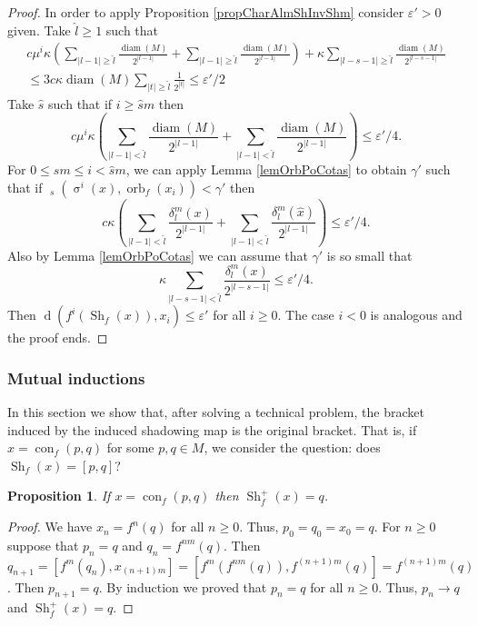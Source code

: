 \documentclass[12pt]{amsart}
\DeclareMathOperator{\shift}{\sigma}
\theoremstyle{plain}
\newtheorem{prop}[thm]{Proposition}
\theoremstyle{definition}
\theoremstyle{remark}
\DeclareMathOperator{\diam}{diam}
\DeclareMathOperator{\dist}{d}
\DeclareMathOperator{\tdist}{\tilde{d}}
\DeclareMathOperator{\orb}{orb}
\DeclareMathOperator{\con}{con}
\DeclareMathOperator{\shm}{Sh}
\renewcommand{\epsilon}{\varepsilon}
\begin{document}
\begin{proof}
	In order to apply Proposition \ref{propCharAlmShInvShm} consider $\epsilon'>0$ given.
	Take $\hat l\geq 1$ such that
	\begin{align*}
	c\mu^i\kappa
	\left(
	\sum_{|l-1|\geq\hat l}\frac{\diam(M)}{2^{|l-1|}}
	+
	\sum_{|l-1|\geq\hat l}\frac{\diam(M)}{2^{|l-1|}}
	\right)
	+
	\kappa \sum_{|l-s-1|\geq\hat l}\frac{\diam(M)}{2^{|l-s-1|}}\\
	\leq 3c\kappa\diam(M)\sum_{|t|\geq\hat l}\frac{1}{2^{|t|}}
	\leq\epsilon'/2
	\end{align*}
	Take $\hat s$ such that if $i\geq \hat sm$ then
	\[
	c\mu^i\kappa
	\left(
	\sum_{|l-1|<\hat l}\frac{\diam(M)}{2^{|l-1|}}
	+
	\sum_{|l-1|<\hat l}\frac{\diam(M)}{2^{|l-1|}}
	\right)
	\leq \epsilon'/4.
	\]
	For $0\leq sm\leq i<\hat s m$, we can apply Lemma \ref{lemOrbPoCotas} to obtain $\gamma'$ such that if
	$\tdist_s(\shift^i(x),\orb_f(x_i))<\gamma'$ then
	\[
	c\kappa
	\left(
	\sum_{|l-1|<\hat l}\frac{\delta_l^m(x)}{2^{|l-1|}}
	+
	\sum_{|l-1|<\hat l}\frac{\delta_l^m(\hat x)}{2^{|l-1|}}
	\right)\leq \epsilon'/4.
	\]
	Also by Lemma \ref{lemOrbPoCotas} we can assume that $\gamma'$ is so small that
	\[
		\kappa \sum_{|l-s-1|<\hat l}\frac{\delta_l^m(x)}{2^{|l-s-1|}}\leq\epsilon'/4.
	\]
	Then $\dist(f^i(\shm_f(x)),x_i)\leq\epsilon'$ for all $i\geq 0$. The case $i<0$ is analogous and the proof ends.
\end{proof}

\subsubsection{Mutual inductions}
In this section we show that, after solving a technical problem, the bracket induced by the induced shadowing map is the original bracket.
That is, if
 $x=\con_f(p,q)$ for some $p,q\in M$, we consider the question: does $\shm_f(x)=[p,q]$?





\begin{prop}
	\label{propshm+}
	If $x=\con_f(p,q)$ then $\shm_f^+(x)=q$.
\end{prop}

\begin{proof}
	We have $x_n=f^n(q)$ for all $n\geq 0$.
	Thus, $p_0=q_0=x_0=q$.
	For $n\geq 0$ suppose that $p_n=q$ and $q_n=f^{nm}(q)$.
	Then $q_{n+1}=[f^m(q_n),x_{(n+1)m}]=[f^m(f^{nm}(q)),f^{(n+1)m}(q)]=f^{(n+1)m}(q)$. Then $p_{n+1}=q$. By induction we proved that $p_n=q$ for all $n\geq 0$.
	Thus, $p_n\to q$ and $\shm_f^+(x)=q$.
\end{proof}
\end{document}
